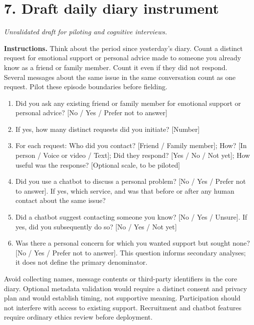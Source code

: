 \documentclass[11pt]{article}
\begin{document}
\section*{7. Draft daily diary instrument}
\textit{Unvalidated draft for piloting and cognitive interviews.}

\textbf{Instructions.} Think about the period since yesterday's diary. Count a distinct request for emotional support or personal advice made to someone you already know as a friend or family member. Count it even if they did not respond. Several messages about the same issue in the same conversation count as one request. Pilot these episode boundaries before fielding.
\begin{enumerate}
\item Did you ask any existing friend or family member for emotional support or personal advice? [No / Yes / Prefer not to answer]
\item If yes, how many distinct requests did you initiate? [Number]
\item For each request: Who did you contact? [Friend / Family member]; How? [In person / Voice or video / Text]; Did they respond? [Yes / No / Not yet]; How useful was the response? [Optional scale, to be piloted]
\item Did you use a chatbot to discuss a personal problem? [No / Yes / Prefer not to answer]. If yes, which service, and was that before or after any human contact about the same issue?
\item Did a chatbot suggest contacting someone you know? [No / Yes / Unsure]. If yes, did you subsequently do so? [No / Yes / Not yet]
\item Was there a personal concern for which you wanted support but sought none? [No / Yes / Prefer not to answer]. This question informs secondary analyses; it does not define the primary denominator.
\end{enumerate}
Avoid collecting names, message contents or third-party identifiers in the core diary. Optional metadata validation would require a distinct consent and privacy plan and would establish timing, not supportive meaning. Participation should not interfere with access to existing support. Recruitment and chatbot features require ordinary ethics review before deployment.
\end{document}

